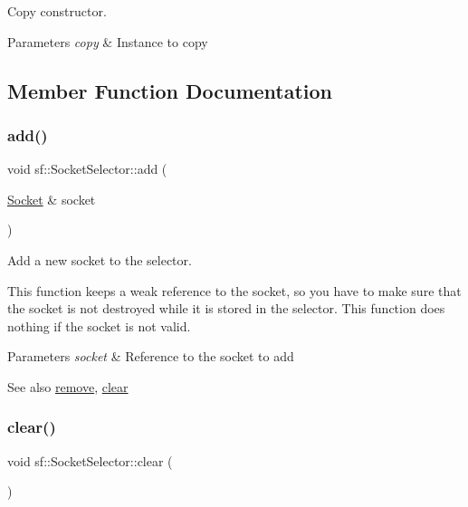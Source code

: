 Copy constructor. 


\begin{DoxyParams}{Parameters}
{\em copy} & Instance to copy \\
\hline
\end{DoxyParams}


\subsection{Member Function Documentation}
\mbox{\label{classsf_1_1_socket_selector_ade952013232802ff7b9b33668f8d2096}} 
\subsubsection{\texorpdfstring{add()}{add()}}
{\footnotesize\ttfamily void sf\+::\+Socket\+Selector\+::add (\begin{DoxyParamCaption}\item[{\hyperlink{classsf_1_1_socket}{Socket} \&}]{socket }\end{DoxyParamCaption})}



Add a new socket to the selector. 

This function keeps a weak reference to the socket, so you have to make sure that the socket is not destroyed while it is stored in the selector. This function does nothing if the socket is not valid.


\begin{DoxyParams}{Parameters}
{\em socket} & Reference to the socket to add\\
\hline
\end{DoxyParams}
\begin{DoxySeeAlso}{See also}
\hyperlink{classsf_1_1_socket_selector_a98b6ab693a65b82caa375639232357c1}{remove}, \hyperlink{classsf_1_1_socket_selector_a76e650acb0199d4be91e90a493fbc91a}{clear} 
\end{DoxySeeAlso}
\mbox{\label{classsf_1_1_socket_selector_a76e650acb0199d4be91e90a493fbc91a}} 
\subsubsection{\texorpdfstring{clear()}{clear()}}
{\footnotesize\ttfamily void sf\+::\+Socket\+Selector\+::clear (\begin{DoxyParamCaption}{ }\end{DoxyParamCaption})}



